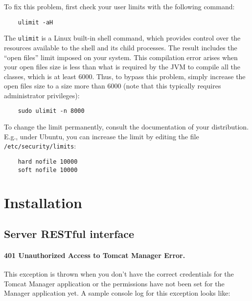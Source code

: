 \noindent To fix this problem, first check your user limits with the
following command:
\begin{verbatim}
    ulimit -aH
\end{verbatim}
The \texttt{ulimit} is a Linux built-in shell command, which provides
control over the resources available to the shell and its child
processes. The result includes the ``open files'' limit imposed on
your system. This compilation error arises when your open files
size is less than what is required by the JVM to compile all the
classes, which is at least 6000. Thus, to bypass this problem, simply
increase the open files size to a size more than 6000 (note that this
typically requires administrator privileges):
\begin{verbatim}
    sudo ulimit -n 8000
\end{verbatim}
To change the limit permanently, consult the documentation of your
distribution. E.g., under Ubuntu, you can increase the limit by
editing the file \verb=/etc/security/limits=:
\begin{verbatim}
    hard nofile 10000
    soft nofile 10000
\end{verbatim}

\section{Installation}
\subsection{\sa Server RESTful interface}
\paragraph{401 Unauthorized Access to Tomcat Manager Error.} This exception is thrown when you don't have the correct credentials for the Tomcat Manager application or the permissions have not been set for the Manager application yet. A sample console log for this exception looks like:

